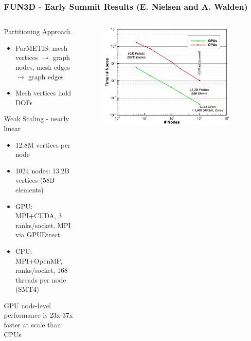 \documentclass[aspectratio=169]{beamer}
\begin{document}
\begin{frame}
  \frametitle{FUN3D - Early Summit Results (E. Nielsen and A. Walden)}
  \begin{columns}
    \begin{column}{0.5\textwidth}
      Partitioning Approach
      \begin{itemize}
        \item ParMETIS: mesh vertices $\rightarrow$ graph nodes, 
          mesh edges $\rightarrow$ graph edges
        \item Mesh vertices hold DOFs
      \end{itemize}
      Weak Scaling - nearly linear
      \begin{itemize}
        \item 12.8M vertices per node
        \item 1024 nodes: 13.2B vertices (58B elements)
        \item GPU: MPI+CUDA, 3 ranks/socket, MPI via GPUDirect
        \item CPU: MPI+OpenMP, ranks/socket, 168 threads per node (SMT4)
      \end{itemize}
      GPU node-level performance is 23x-37x faster at scale than CPUs
    \end{column}
    \begin{column}{0.5\textwidth}
      \begin{figure}
        \centering
        \includegraphics[width=\textwidth]{figures/fun3d-summit.png}
      \end{figure}
    \end{column}
  \end{columns}
\end{frame}
\end{document}
